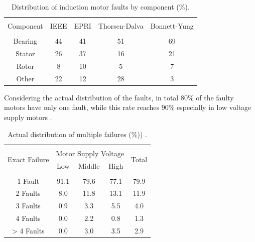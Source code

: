 \begin{table}[h]
	{\setlength{\tabcolsep}{12pt}
		\caption{Distribution of induction motor faults by component (\%).}
		\begin{center}
			\vspace{-6mm}
			\begin{tabular}{ccccc}
				\hline \\[-2.45ex] \hline \\[-2.1ex]
				Component & IEEE & EPRI & Thorsen-Dalva & Bonnett-Yung \\
				\hline \\[-1.8ex]
				Bearing & 44 & 41 & 51 & 69 \\
				Stator & 26 & 37  & 16 & 21\\
				Rotor & 8 & 10 & 5 & 7 \\
				Other & 22 & 12  & 28 & 3\\
				\hline
			\end{tabular}
			\vspace{-6mm}
		\end{center}
		\label{Table2.1}}
\end{table}

Considering the actual distribution of the faults, in total 80\% of the faulty motors have only one fault, while this rate reaches 90\% especially in low voltage supply motors \cite{albrecht1987assessment}.

\begin{table}[h]
	{\setlength{\tabcolsep}{12pt}
		\caption{Actual distribution of multiple failures (\%)) \cite{albrecht1987assessment}.}
		\begin{center}
			\vspace{-6mm}
			\begin{tabular}{ccccc}
				\hline \\[-2.45ex] \hline \\[-2.1ex]
				\multirow{2}{*}{Exact Failure} & \multicolumn{3}{c}{Motor Supply Voltage} & \multirow{2}{*}{Total} \\
				& Low  & Middle & High &      \\
				\hline \\[-1.8ex]
				1 Fault   & 91.1 & 79.6   & 77.1 & 79.9 \\
				2 Faults  & 8.0  & 11.8   & 13.1 & 11.9 \\
				3 Faults  & 0.9  & 3.3    & 5.5  & 4.0  \\
				4 Faults  & 0.0  & 2.2    & 0.8  & 1.3  \\
				> 4 Faults & 0.0  & 3.0    & 3.5  & 2.9  \\
				\hline
			\end{tabular}
			\vspace{-6mm}
		\end{center}
		\label{Table2.2}}
\end{table}

